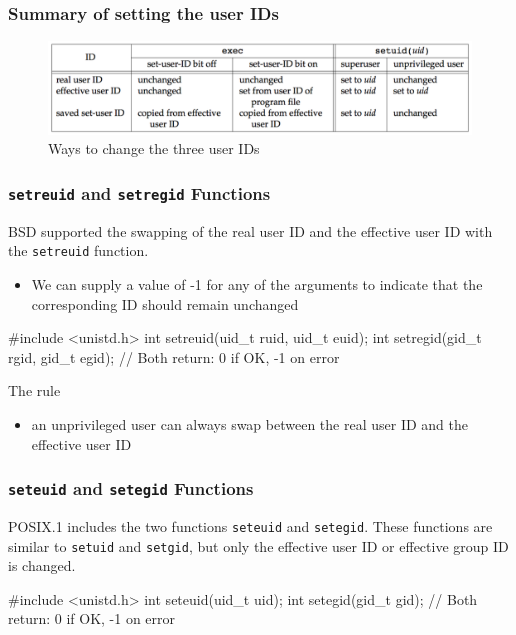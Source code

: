 \documentclass[newPxFont,sthlmFooter,nooffset]{beamer}
\begin{document}
\begin{frame}[t]
  \frametitle{Summary of setting the user IDs}
  \begin{figure}[h]
    \centering
    \includegraphics[width=\linewidth]{figure/fig8-18_ways.png}
    \caption{Ways to change the three user IDs}
    \label{fig:ways}
  \end{figure}
\end{frame}


\begin{frame}[containsverbatim,t]
  \frametitle{\texttt{setreuid} and \texttt{setregid} Functions}
BSD supported the swapping of the real user ID and the effective user ID
with the \texttt{setreuid} function.
\begin{itemize}
\item We can supply a value of -1 for any of the arguments to indicate that the corresponding ID should remain unchanged
\end{itemize}
\begin{codedef}
#include <unistd.h>
int setreuid(uid_t ruid, uid_t euid); 
int setregid(gid_t rgid, gid_t egid);
// Both return: 0 if OK, -1 on error  
\end{codedef}

The rule
\begin{itemize}
\item an unprivileged user can always swap between the real user ID and the effective user ID
\end{itemize}
\end{frame}


\begin{frame}[containsverbatim,t]
  \frametitle{\texttt{seteuid} and \texttt{setegid} Functions}
POSIX.1 includes the two functions \texttt{seteuid} and \texttt{setegid}. These functions are similar to \texttt{setuid} and \texttt{setgid}, but only the effective user ID or effective group ID is changed.
\begin{codedef}
#include <unistd.h> 
int seteuid(uid_t uid); 
int setegid(gid_t gid);
// Both return: 0 if OK, -1 on error  
\end{codedef}
\end{frame}
\end{document}
